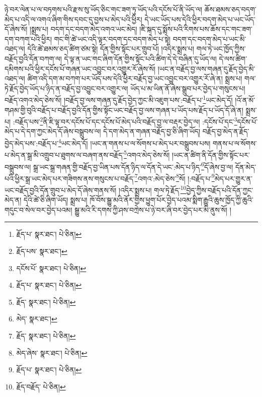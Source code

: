 ཉེ་བར་ལེན་པ་ལ་བཏགས་པའི་རྫས་སུ་ཡོད་ཅིང་གང་ཟག་ཏུ་ཡོད་པའི་དངོས་པོ་ནི་ཡོད་ལ། ཆོས་ཐམས་ཅད་བདག་མེད་པ་འདི་ལ་འགའ་ཞིག་གིས་དབང་དུ་བྱས་པ་མེད་པའི་ཕྱིར། དེ་ཡང་ཡོད་པས་དེའི་ཕྱིར་བདག་མེད་པ་ཡང་ཡོད་དོ་ཞེས་སོ། །སྨྲས་པ། བདག་དང་བདག་མེད་འགའ་ཡང་མེད། །ཇི་སྐད་དུ་སྨོས་པའི་རིགས་པས་ཆོས་དང་གང་ཟག་དག་བཀག་པའི་ཕྱིར། གང་གི་ཚེ་ཡང་འདི་ལྟར་བདག་དང་བདག་མེད་པ་སྟེ། བདག་དང་བདག་མེད་པ་ཡང་མི་འཐད་ལ། དེའི་ཚེ་ཐམས་ཅད་ཚིག་ཙམ་སྟེ། དོན་གྱིས་སྟོང་པར་གྲུབ་པོ། །འདིར་སྨྲས་པ། གལ་ཏེ་ཡང་ཁྱོད་ཀྱིས་བརྗོད་བྱའི་དོན་བཀག་ལ། དེ་ལྟ་ན་ཡང་གང་ཞིག་དོན་གྱིས་སྟོང་པའི་ཚིག་དེ་དེ་བཞིན་དུ་ཡོད་ལ། དེ་ལས་ཚིག་དམིགས་པའི་ཕྱིར་དངོས་པོ་གཞན་ཡང་འབྱུང་བར་འགྱུར་རོ་ཞེས་སོ། །ཡང་ན་བརྗོད་བྱ་ལས་གཞན་དུ་རྗོད་བྱེད་མི་འཐད་ལ། ཚིག་འདི་དག་མ་བཀག་པར་ཡོད་པས་དེའི་ཕྱིར་བརྗོད་བྱ་ཡང་འབྱུང་བར་འགྱུར་རོ་ཞེ་ན། སྨྲས་པ། གལ་ཏེ་རྗོད་བྱེད་ཡོད་པ་ཉིད་ན་བརྗོད་བྱ་འབྱུང་བར་འགྱུར་ལ། ཡོད་པ་མ་ཡིན་ནོ་ཞེས་སྒྲུབ་པར་བྱེད་པ་གསུངས་པ། བརྗོད་འགའ་མེད་ཅེས་སོ། །བརྗོད་བྱ་ལས་གཞན་དུ་རྗོད་བྱེད་ཀྱང་མི་འཇུག་པས་:བརྗོད་པ་\footnote{རྗོད་པ་  སྣར་ཐང་།  པེ་ཅིན། }ཡང་མེད་དོ། །འོ་ན་མོ་གཤམ་གྱི་བུའི་བརྗོད་པ་བརྗོད་བྱའི་དོན་གྱིས་སྟོང་ཡང་བརྗོད་བྱ་ལས་གཞན་པ་ཡོད་པས་རྗོད་པ་ཡོད་དོ་ཞེ་ན། སྨྲས་པ། :བརྗོད་པས་\footnote{རྗོད་པས་  སྣར་ཐང་། }ནི་ཇི་ལྟ་བར་དངོས་པོ་དང་དངོས་པོ་མེད་པའི་བརྗོད་བྱ་ལ་བརྡར་བྱེད་ལ། :དངོས་པོ་དང་\footnote{དངོས་པོ་  སྣར་ཐང་།  པེ་ཅིན། }དངོས་པོ་མེད་པ་དེ་དག་ཀྱང་མེད་དོ་ཞེས་བསྒྲུབས་ལ། དེ་དག་མེད་ན་གཞན་བརྗོད་བྱ་ཅི་ཞིག་ཡོད། བརྗོད་བྱ་མེད་ན་རྗོད་བྱེད་མེད་པས་:བརྗོད་པ་\footnote{རྗོད་པ་  སྣར་ཐང་།  པེ་ཅིན། }ཡང་མེད་དོ། །ཡང་ན་གནས་པ་ལ་སོགས་པ་མེད་པར་བསྒྲུབས་པས། གནས་པ་ལ་སོགས་པ་མེད་ན་སྒྲ་མི་འགྲུབ་པ་ཐུགས་ལ་བཞག་ནས་བརྗོད་\footnote{རྗོད་  སྣར་ཐང་།  པེ་ཅིན། }འགའ་མེད་ཅེས་སོ། །ཡང་ན་ཚིག་ནི་དོན་གྱིས་སྟོང་པར་བསྒྲུབས་ལ། སྒྲ་ཡང་སྒྲ་གཞན་གྱི་བརྗོད་བྱ་ཡིན་པས་དོན་ཉིད་ལ་དོན་དེ་ཡང་:མེད་པ་ཉིད་\footnote{མེད་  སྣར་ཐང་། }དོ་ཞེས་བྱ་ལ། དོན་མེད་པའི་ཕྱིར་སྒྲ་ཡང་མེད་པར་གཟིགས་ནས་གསུངས་པ་བརྗོད་\footnote{རྗོད་  སྣར་ཐང་།  པེ་ཅིན། }འགའ་:མེད་ཅེས་\footnote{མེད་ཞེས་  སྣར་ཐང་།  པེ་ཅིན། }སོ། །:བརྗོད་པ་\footnote{རྗོད་པ་  སྣར་ཐང་།  པེ་ཅིན། }མེད་པར་གྱུར་ན་ཡང་བརྗོད་བྱའི་དོན་གྲུབ་པ་མེད་དོ་ཞེས་གནས་སོ། །འདིར་སྨྲས་པ། གལ་ཏེ་རྗོད་\footnote{རྗོད་བརྗོད་  པེ་ཅིན། }བྱེད་ཀྱིས་བརྗོད་པའི་དོན་ཀྱང་མེད་ན། དེའི་ཚེ་ཅི་ཞིག་ཡོད། སྨྲས་པ། ཁོ་བོས་སྒྱུ་མའི་ནོར་གྱིས་ཕྱུག་པོར་བྱེད་པའམ་སྨིག་རྒྱུའི་ཆུས་ཁྱོད་ཀྱི་ཆུའི་གདུང་བ་སེལ་བར་བྱེད་པའམ། སྒྱུ་མའི་རི་དགས་ཀྱི་ཤས་བཀྲེས་པ་ཉེ་བར་ཞི་བར་བྱེད་པར་མི་ནུས་སོ། །
